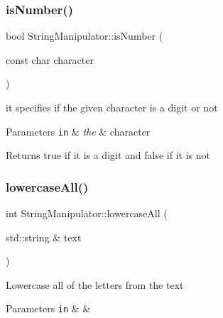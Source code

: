 \subsubsection{\texorpdfstring{is\+Number()}{isNumber()}}
{\footnotesize\ttfamily bool String\+Manipulator\+::is\+Number (\begin{DoxyParamCaption}\item[{const char}]{character }\end{DoxyParamCaption})\hspace{0.3cm}{\ttfamily [static]}}

it specifies if the given character is a digit or not


\begin{DoxyParams}[1]{Parameters}
\mbox{\tt in}  & {\em the} & character\\
\hline
\end{DoxyParams}
\begin{DoxyReturn}{Returns}
true if it is a digit and false if it is not 
\end{DoxyReturn}
\mbox{\label{class_string_manipulator_af7e1662a6c1a1210e58f521db6a132cd}} 
\subsubsection{\texorpdfstring{lowercase\+All()}{lowercaseAll()}}
{\footnotesize\ttfamily int String\+Manipulator\+::lowercase\+All (\begin{DoxyParamCaption}\item[{std\+::string \&}]{text }\end{DoxyParamCaption})\hspace{0.3cm}{\ttfamily [static]}}

Lowercase all of the letters from the text


\begin{DoxyParams}[1]{Parameters}
\mbox{\tt in}  & {\em } & \\
\hline
\end{DoxyParams}
\mbox{\label{class_string_manipulator_ad94710fa3a5e1a3c3ff7284ecb9c6f33}} 
